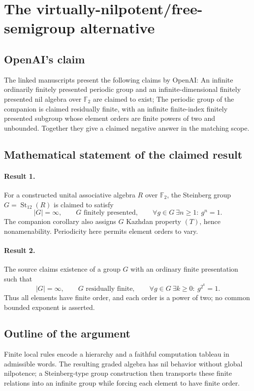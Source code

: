 \documentclass[11pt]{article}
\begin{document}
\section*{The virtually-nilpotent/free-semigroup alternative}

\subsection{OpenAI's claim}
The linked manuscripts present the following claims by OpenAI: An infinite ordinarily finitely presented periodic group and an infinite-dimensional finitely presented nil algebra over $\mathbb F_2$ are claimed to exist; The periodic group of the companion is claimed residually finite, with an infinite finite-index finitely presented subgroup whose element orders are finite powers of two and unbounded. Together they give a claimed negative answer in the matching scope.

\subsection{Mathematical statement of the claimed result}
\paragraph{Result 1.} For a constructed unital associative algebra \(R\) over \(\mathbb F_2\), the Steinberg group \(G=\operatorname{St}_{12}(R)\) is claimed to satisfy
\[
 |G|=\infty,\qquad G\text{ finitely presented},\qquad
 \forall g\in G\ \exists n\ge1:\ g^n=1.
\]
The companion corollary also assigns \(G\) Kazhdan property \((T)\), hence nonamenability. Periodicity here permits element orders to vary.

\paragraph{Result 2.} The source claims existence of a group \(G\) with an ordinary finite presentation such that
\[
 |G|=\infty,\qquad G\text{ residually finite},\qquad
 \forall g\in G\ \exists k\ge0:\ g^{2^k}=1.
\]
Thus all elements have finite order, and each order is a power of two; no common bounded exponent is asserted.

\subsection{Outline of the argument}
Finite local rules encode a hierarchy and a faithful computation tableau in admissible words. The resulting graded algebra has nil behavior without global nilpotence; a Steinberg-type group construction then transports these finite relations into an infinite group while forcing each element to have finite order.
\end{document}
